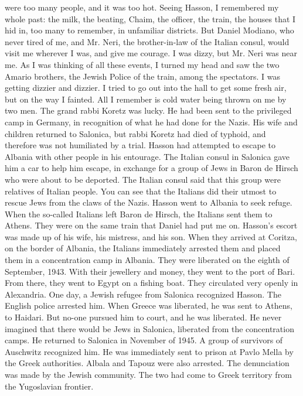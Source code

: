 were too many people, and it was too hot. Seeing Hasson, I remembered my 
whole past: the milk, the beating, Chaim, the officer, the train, the 
houses that I hid in, too many to remember, in unfamiliar districts. But 
Daniel Modiano, who never tired of me, and Mr. Neri, the brother-in-law 
of the Italian consul, would visit me wherever I was, and give me courage. I was dizzy, but Mr. Neri was near me. 
As I was thinking of all these events, I turned my head and saw the 
two Amario brothers, the Jewish Police of the train, among the spectators. I was getting dizzier and dizzier. I tried to go out into the 
hall to get some fresh air, but on the way I fainted. All I remember 
is cold water being thrown on me by two men. 
The grand rabbi Koretz was lucky. He had been sent to the privileged camp in Germany, in recognition of what he had done for the Nazis. 
His wife and children returned to Salonica, but rabbi Koretz had died 
of typhoid, and therefore was not humiliated by a trial. 
Hasson had attempted to escape to Albania with other people in his 
entourage. The Italian consul in Salonica gave him a car to help him escape, in exchange for a group of Jews in Baron de Hirsch who were about to be deported. The Italian consul said that this group were relatives of Italian people. You can see that the Italians did their 
utmost to rescue Jews from the claws of the Nazis. 
Hasson went to Albania to seek refuge. When the so-called Italians 
left Baron de Hirsch, the Italians sent them to Athens. They were on the 
same train that Daniel had put me on. 
Hasson's escort was made up of his wife, his mistress, and his son. 
When they arrived at Coritza, on the border of Albania, the Italians immediately arrested them and placed them in a concentration camp in Albania. They were liberated on the eighth of September, 1943. With their 
jewellery and money, they went to the port of Bari. From there, they 
went to Egypt on a fishing boat. They circulated very openly in Alexandria. One day, a Jewish refugee from Salonica recognized Hasson. The English police arrested him. When Greece was liberated, he was sent to Athens, to Haidari. But no-one pursued him to court, and he was liberated. He never imagined that there would be Jews in Salonica, liberated 
from the concentration camps. He returned to Salonica in November of 
1945. A group of survivors of Auschwitz recognized him. He was immediately sent to prison at Pavlo Mella by the Greek authorities. 
Albala and Tapouz were also arrested. The denunciation was made by 
the Jewish community. The two had come to Greek territory from the Yugoslavian frontier. 
